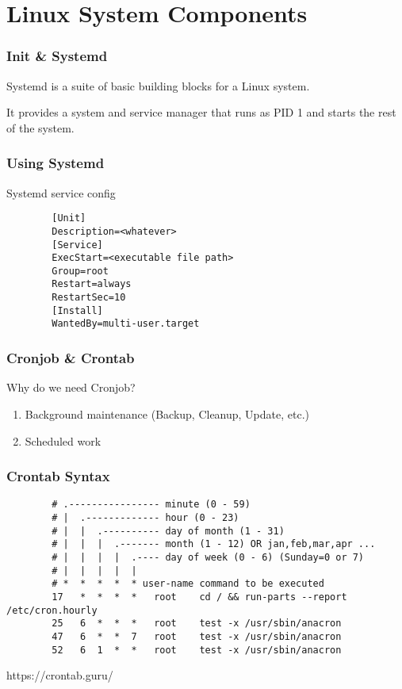 \section{Linux System Components}

\begin{frame}
    \frametitle{Init \& Systemd}

    Systemd is a suite of basic building blocks for a Linux system.

    It provides a system and service manager that runs as PID 1 and starts the rest of the system.


\end{frame}

\begin{frame}[fragile]
    \frametitle{Using Systemd}

    Systemd service config

    \vspace{2em}

    \begin{lstlisting}
        [Unit]
        Description=<whatever>
        [Service]
        ExecStart=<executable file path>
        Group=root
        Restart=always
        RestartSec=10
        [Install]
        WantedBy=multi-user.target
    \end{lstlisting}

\end{frame}


\begin{frame}
    \frametitle{Cronjob \& Crontab}

    Why do we need Cronjob?

    \vspace{2em}

    \begin{enumerate}
        \item Background maintenance (Backup, Cleanup, Update, etc.)
        \item Scheduled work
    \end{enumerate}


\end{frame}


\begin{frame}[fragile]
    \frametitle{Crontab Syntax}

    \begin{lstlisting}
        # .---------------- minute (0 - 59)
        # |  .------------- hour (0 - 23)
        # |  |  .---------- day of month (1 - 31)
        # |  |  |  .------- month (1 - 12) OR jan,feb,mar,apr ...
        # |  |  |  |  .---- day of week (0 - 6) (Sunday=0 or 7) 
        # |  |  |  |  |
        # *  *  *  *  * user-name command to be executed
        17   *  *  *  *   root    cd / && run-parts --report /etc/cron.hourly
        25   6  *  *  *   root    test -x /usr/sbin/anacron 
        47   6  *  *  7   root    test -x /usr/sbin/anacron 
        52   6  1  *  *   root    test -x /usr/sbin/anacron 
    \end{lstlisting}

    https://crontab.guru/

\end{frame}